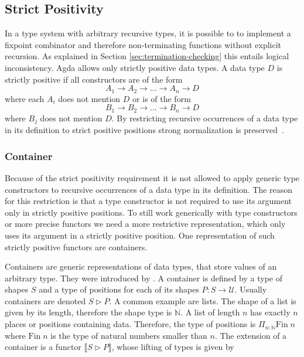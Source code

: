 \subsection{Strict Positivity}

In a type system with arbitrary recursive types, it is possible to to implement a
fixpoint combinator and therefore non-terminating functions without explicit
recursion.
As explained in Section \ref{sec:termination-checking} this entails logical
inconsistency.
Agda allows only strictly positive data types.
A data type $D$ is strictly positive if all constructors are of the form
$$
  A_1 \rightarrow A_2 \rightarrow \dots \rightarrow A_n \rightarrow D
$$
where each $A_i$ does not mention $D$ or is of the form
$$
B_1 \rightarrow B_2 \rightarrow \dots \rightarrow B_n \rightarrow D
$$
where $B_j$ does not mention $D$.
By restricting recursive occurrences of a data type in its definition to strict
positive positions strong normalization is
preserved~\cite{Wadler1991RecursiveTF}.


\subsubsection{Container}
\label{container}

Because of the strict positivity requirement it is not allowed to apply generic
type constructors to recursive occurrences of a data type in its definition.
The reason for this restriction is that a type constructor is not required to
use its argument only in strictly positive positions.
To still work generically with type constructors or more precise functors we
need a more restrictive representation, which only uses its argument in a
strictly positive position.
One representation of such strictly positive functors are containers.

Containers are generic representations of data types, that store values of an
arbitrary type.
They were introduced by \textcite{DBLP:conf/fossacs/AbbottAG03}.
A container is defined by a type of shapes $S$ and a type of positions for each
of its shapes $P : S \rightarrow \mathcal{U}$.
Usually containers are denoted $S \rhd P$.
A common example are lists.
The shape of a list is given by its length, therefore the shape type is
$\mathbb{N}$.
A list of length $n$ has exactly $n$ places or positions containing data.
Therefore, the type of positions is $\Pi_{n : \mathbb{N}}\mathrm{Fin}\;n$ where
$\mathrm{Fin}\;n$ is the type of natural numbers smaller than $n$.
The extension of a container is a functor $\lBrack S \rhd P \rBrack $,
whose lifting of types is given by

